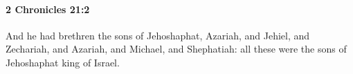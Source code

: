 
		\paragraph{2 Chronicles 21:2} %
			\label{2CHRONICLES-21-2}

			And he had brethren the sons of Jehoshaphat, Azariah, and Jehiel, and Zechariah, and Azariah, and Michael, and Shephatiah: all these were the sons of Jehoshaphat king of Israel.


